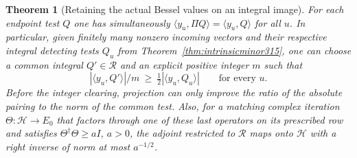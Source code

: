 \documentclass[a4paper,11pt]{article}
\newtheorem{theorem}[proposition]{Theorem}
\theoremstyle{definition}
\theoremstyle{remark}
\numberwithin{equation}{section}
\begin{document}
\begin{theorem}[Retaining the actual Bessel values on an integral image]\leavevmode
\label{thm:imagereverse320}
For each endpoint test \(Q\) one has simultaneously
\(\langle y_u,\Pi Q\rangle=\langle y_u,Q\rangle\) for
all \(u\). In particular, given finitely many nonzero
incoming vectors and their respective integral detecting
tests \(Q_u\) from Theorem~\ref{thm:intrinsicminor315},
one can choose a common integral \(Q'\in\mathcal R\) and
an explicit positive integer \(m\) such that
\[
       |\langle y_u,Q'\rangle|/m
                 \ \ge\ \tfrac12|\langle y_u,Q_u\rangle|
                   \qquad\text{for every }u .
\]
Before the integer clearing, projection can only improve
the ratio of the absolute pairing to the norm of the common
test. Also, for a matching complex iteration
\(\Theta:\mathcal H\to E_0\) that factors through one of
these last operators on its prescribed row and satisfies
\(\Theta^\dagger\Theta\ge aI\), \(a>0\), the adjoint
restricted to \(\mathcal R\) maps onto \(\mathcal H\)
with a right inverse of norm at most \(a^{-1/2}\).
\end{theorem}
\end{document}
